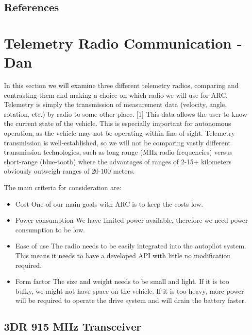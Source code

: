 \documentclass[compsoc,draftclsnofoot,onecolumn,10pt]{IEEEtran}
\begin{document}
\subsection{References}

\newpage

\section{Telemetry Radio Communication - Dan}
In this section we will examine three different telemetry radios, comparing and
contrasting them and making a choice on which radio we will use for ARC.
Telemetry is simply the transmission of measurement data (velocity, angle,
rotation, etc.) by radio to some other place. [1] This data allows the user to know the current state of the vehicle. This is especially
important for autonomous operation, as the vehicle may not be operating within
line of sight. Telemetry transmission is
well-established, so we will not be comparing vastly different transmission
technologies, such as long range (MHz radio frequencies) versus short-range
(blue-tooth) where the advantages of ranges of 2-15+ kilometers obviously
outweigh ranges of 20-100 meters.

The main criteria for consideration are:
\begin{itemize}

	\item Cost
		\subitem One of our main goals with ARC is to keep the costs low.
	\item Power consumption
		\subitem We have limited power available, therefore we need power
		consumption to be low.

	\item Ease of use
		\subitem The radio needs to be easily integrated into the autopilot
		system. This means it needs to have a developed API with little no
		modification required.

	\item Form factor
		\subitem The size and weight needs to be small and light. If it is too
		bulky, we might not have space on the vehicle. If it is too heavy, more
		power will be required to operate the drive system and will drain the
		battery faster.

\end{itemize}


\subsection{3DR 915 MHz Transceiver}
\end{document}
